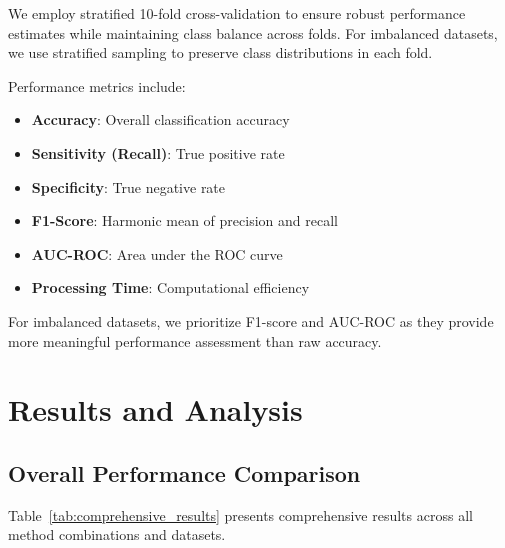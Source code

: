 \documentclass[review]{elsarticle}
\begin{document}
We employ stratified 10-fold cross-validation to ensure robust performance estimates while maintaining class balance across folds. For imbalanced datasets, we use stratified sampling to preserve class distributions in each fold.

Performance metrics include:
\begin{itemize}
\item \textbf{Accuracy}: Overall classification accuracy
\item \textbf{Sensitivity (Recall)}: True positive rate
\item \textbf{Specificity}: True negative rate  
\item \textbf{F1-Score}: Harmonic mean of precision and recall
\item \textbf{AUC-ROC}: Area under the ROC curve
\item \textbf{Processing Time}: Computational efficiency
\end{itemize}

For imbalanced datasets, we prioritize F1-score and AUC-ROC as they provide more meaningful performance assessment than raw accuracy.

\section{Results and Analysis}
\label{sec:results}

\subsection{Overall Performance Comparison}

Table~\ref{tab:comprehensive_results} presents comprehensive results across all method combinations and datasets.
\end{document}
